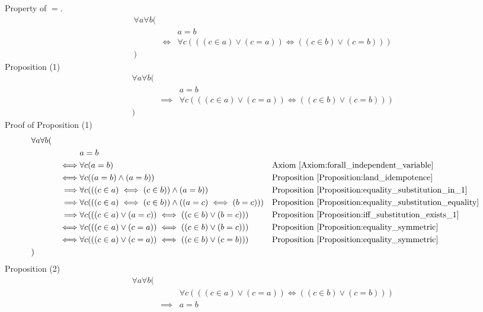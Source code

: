 \begin{prop}
\label{Proposition:equality_property_3}
Property of $=$.
\begin{align*}
& \forall a \forall b ( \\
& & & a = b \\
& & \iff & \forall c (((c \in a) \lor (c = a)) \iff ((c \in b) \lor (c = b))) \\
& )
\end{align*}
Proposition (1)
\begin{align*}
& \forall a \forall b ( \\
& & & a = b \\
& & \implies & \forall c (((c \in a) \lor (c = a)) \iff ((c \in b) \lor (c = b))) \\
& )
\end{align*}
Proof of Proposition (1)
\begin{align*}
& \forall a \forall b ( \\
& & & a = b \\
& & \iff & \forall c (a = b)
& & \text{Axiom \ref{Axiom:forall_independent_variable}} \\
& & \iff & \forall c ((a = b) \land (a = b))
& & \text{Proposition \ref{Proposition:land_idempotence}} \\
& & \implies & \forall c (((c \in a) \iff (c \in b)) \land (a = b))
& & \text{Proposition \ref{Proposition:equality_substitution_in_1}} \\
& & \implies & \forall c (((c \in a) \iff (c \in b)) \land ((a = c) \iff (b = c)))
& & \text{Proposition \ref{Proposition:equality_substitution_equality}} \\
& & \implies & \forall c (((c \in a) \lor (a = c)) \iff ((c \in b) \lor (b = c)))
& & \text{Proposition \ref{Proposition:iff_substitution_exists_1}} \\
& & \iff & \forall c (((c \in a) \lor (c = a)) \iff ((c \in b) \lor (b = c)))
& & \text{Proposition \ref{Proposition:equality_symmetric}} \\
& & \iff & \forall c (((c \in a) \lor (c = a)) \iff ((c \in b) \lor (c = b)))
& & \text{Proposition \ref{Proposition:equality_symmetric}} \\
& )
\end{align*}
Proposition (2)
\begin{align*}
& \forall a \forall b ( \\
& & & \forall c (((c \in a) \lor (c = a)) \iff ((c \in b) \lor (c = b))) \\
& & \implies & a = b \\

\end{align*}
\end{prop}

